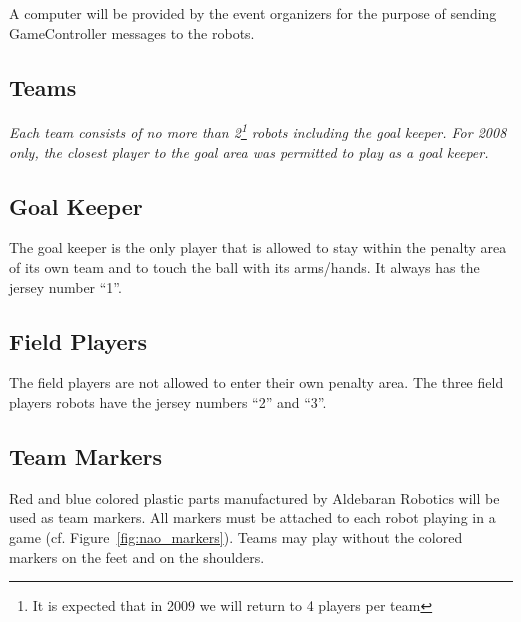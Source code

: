 \documentclass[12pt]{article}
\newcommand{\cf}{\mbox{cf.}\xspace}
\begin{document}
A computer will be provided by the event organizers for the purpose
of sending GameController messages to the robots.

\subsection{Teams}
\emph{Each team consists of no more than 2\footnote{It is expected that in 2009 we will return to 4 players per team} robots including the goal keeper. For 2008 only, the closest player to the goal area was permitted to play as a goal keeper.}

\subsection{Goal Keeper}
\label{sec:goal_keeper}

The goal keeper is the only player that is allowed to stay within
the penalty area of its own team and to touch the ball with its arms/hands. It always has the jersey number
``1''.

\subsection{Field Players}
\label{sec:field_players}

The field players are not allowed to enter their own penalty area.
The three field players robots have the jersey numbers ``2'' and ``3''.

\subsection{Team Markers}

Red and blue colored plastic parts manufactured by Aldebaran Robotics will be used as team markers. All markers
must be attached to each robot playing in a game (\cf Figure~\ref{fig:nao_markers}). Teams may play without the colored markers on the feet and on the shoulders.
\end{document}
